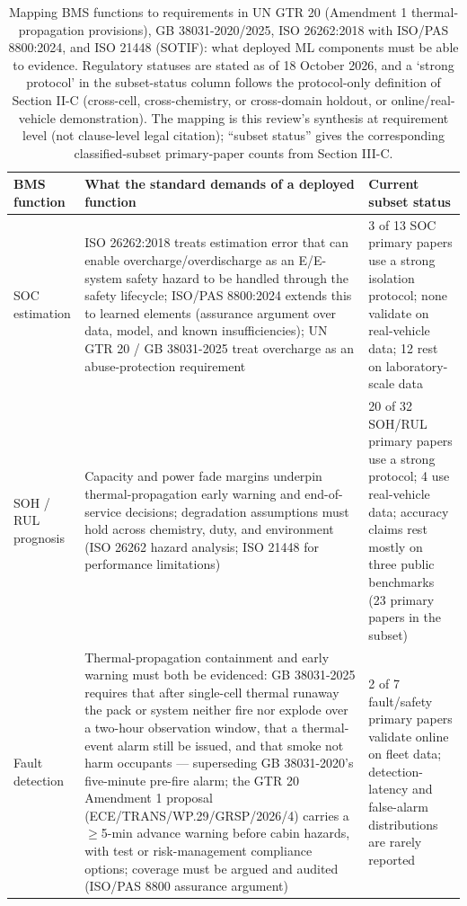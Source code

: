 \documentclass[journal]{IEEEtran}
\begin{document}
\begin{table}[!t]
\caption{Mapping BMS functions to requirements in UN GTR 20 (Amendment 1 thermal-propagation provisions), GB 38031-2020/2025, ISO 26262:2018 with ISO/PAS 8800:2024, and ISO 21448 (SOTIF): what deployed ML components must be able to evidence. Regulatory statuses are stated as of 18 October 2026, and a `strong protocol' in the subset-status column follows the protocol-only definition of Section II-C (cross-cell, cross-chemistry, or cross-domain holdout, or online/real-vehicle demonstration). The mapping is this review's synthesis at requirement level (not clause-level legal citation); ``subset status'' gives the corresponding classified-subset primary-paper counts from Section III-C.}
\label{tab:TABLE_STD}
\centering
\footnotesize
\begin{tabular}{|p{0.70in}|p{2.97in}|p{2.97in}|}
\hline
\textbf{BMS function} & \textbf{What the standard demands of a deployed function} & \textbf{Current subset status} \\
\hline
SOC estimation & ISO 26262:2018 treats estimation error that can enable overcharge/overdischarge as an E/E-system safety hazard to be handled through the safety lifecycle; ISO/PAS 8800:2024 extends this to learned elements (assurance argument over data, model, and known insufficiencies); UN GTR 20 / GB 38031-2025 treat overcharge as an abuse-protection requirement & 3 of 13 SOC primary papers use a strong isolation protocol; none validate on real-vehicle data; 12 rest on laboratory-scale data \\
SOH / RUL prognosis & Capacity and power fade margins underpin thermal-propagation early warning and end-of-service decisions; degradation assumptions must hold across chemistry, duty, and environment (ISO 26262 hazard analysis; ISO 21448 for performance limitations) & 20 of 32 SOH/RUL primary papers use a strong protocol; 4 use real-vehicle data; accuracy claims rest mostly on three public benchmarks (23 primary papers in the subset) \\
Fault detection & Thermal-propagation containment and early warning must both be evidenced: GB 38031-2025 requires that after single-cell thermal runaway the pack or system neither fire nor explode over a two-hour observation window, that a thermal-event alarm still be issued, and that smoke not harm occupants --- superseding GB 38031-2020's five-minute pre-fire alarm; the GTR 20 Amendment 1 proposal (ECE/TRANS/WP.29/GRSP/2026/4) carries a $\ge$5-min advance warning before cabin hazards, with test or risk-management compliance options; coverage must be argued and audited (ISO/PAS 8800 assurance argument) & 2 of 7 fault/safety primary papers validate online on fleet data; detection-latency and false-alarm distributions are rarely reported \\

\end{tabular}
\end{table}
\end{document}
